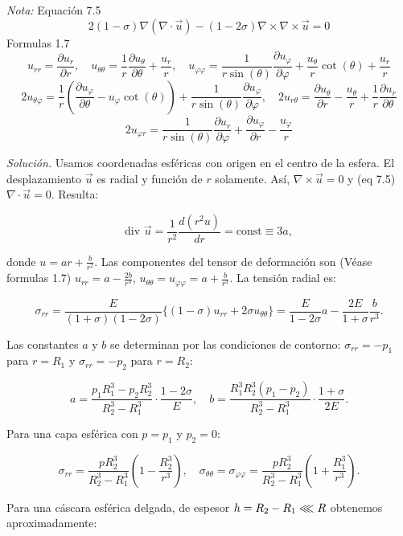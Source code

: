 \documentclass{article}
\begin{document}
\textit{Nota:} Equación 7.5 $$2(1-\sigma)\nabla(\nabla \cdot \vec{u}) - (1-2\sigma)\nabla \times \nabla \times \vec{u} = 0$$
Formulas 1.7 $$ u_{rr} = \frac{\partial u_r}{\partial r}, \quad u_{\theta \theta} = \frac{1}{r}\frac{\partial u_\theta}{\partial \theta} + \frac{u_r}{r}, \quad u_{\varphi \varphi} = \frac{1}{r\sin(\theta)}\frac{\partial u_\varphi}{\partial \varphi} + \frac{u_\theta}{r}\cot(\theta) + \frac{u_r}{r} $$
$$ 2u_{\theta \varphi} = \frac{1}{r}\left(\frac{\partial u_\varphi}{\partial \theta}- u_\varphi \cot(\theta)\right) + \frac{1}{r\sin(\theta)}\frac{\partial u_\varphi}{\partial \varphi}, \quad 2u_{r\theta} = \frac{\partial u_\theta }{\partial r}-\frac{u_\theta}{r} + \frac{1}{r}\frac{\partial u_r }{\partial \theta}$$
$$ 2u_{\varphi r}=\frac{1}{r\sin(\theta)}\frac{\partial u_r}{\partial \varphi}+\frac{\partial u_\varphi}{\partial r}-\frac{u_\varphi}{r} $$

\textit{Solución.} Usamos coordenadas esféricas con origen en el centro de la esfera. El desplazamiento $\vec{u}$ es radial y función de $r$ solamente. Así, $\nabla \times \vec{u} = 0$ y (eq 7.5)$\nabla \cdot \vec{u} = 0$. Resulta:

$$
\text{div } \vec{u} = \frac{1}{r^2} \frac{d(r^2 u)}{dr} = \text{const} \equiv 3a,
$$

donde $u = ar + \frac{b}{r^2}$. Las componentes del tensor de deformación son (Véase formulas 1.7) $u_{rr} = a - \frac{2b}{r^3}$, $u_{\theta\theta} = u_{\varphi\varphi} = a + \frac{b}{r^3}$. La tensión radial es:

$$
\sigma_{rr} = \frac{E}{(1+\sigma)(1-2\sigma)} \{(1-\sigma)u_{rr} + 2\sigma u_{\theta\theta}\} = \frac{E}{1-2\sigma} a - \frac{2E}{1+\sigma} \frac{b}{r^3}.
$$

Las constantes $a$ y $b$ se determinan por las condiciones de contorno: $\sigma_{rr} = -p_1$ para $r = R_1$ y $\sigma_{rr} = -p_2$ para $r = R_2$:

$$
a = \frac{p_1 R_1^3 - p_2 R_2^3}{R_2^3 - R_1^3} \cdot \frac{1-2\sigma}{E}, \quad b = \frac{R_1^3 R_2^3 (p_1 - p_2)}{R_2^3 - R_1^3} \cdot \frac{1+\sigma}{2E}.
$$

Para una capa esférica con $p = p_1$ y $p_2 = 0$:

$$
\sigma_{rr} = \frac{p R_2^3}{R_2^3 - R_1^3} \left(1 - \frac{R_2^3}{r^3}\right), \quad \sigma_{\theta\theta} = \sigma_{\varphi\varphi} = \frac{p R_2^3}{R_2^3 - R_1^3} \left(1 + \frac{R_1^3}{r^3}\right).
$$

Para una cáscara esférica delgada, de espesor $h= R_2-R_1 \llless R$ obtenemos aproximadamente:
\end{document}
